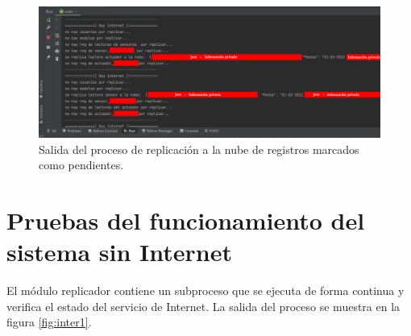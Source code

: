 \begin{figure}[htpb]
\centering 
\includegraphics[width=1.0\textwidth]{./Figures/test/replicador/sinReplicar2.png}
\caption{Salida del proceso de replicación a la nube de registros marcados como pendientes.}
\label{fig:r2}
\end{figure}


\section{Pruebas del funcionamiento del sistema sin Internet}

El módulo replicador contiene un subproceso que se ejecuta de forma continua y verifica el estado del servicio de Internet. La salida del proceso se muestra en la figura \ref{fig:inter1}. 

